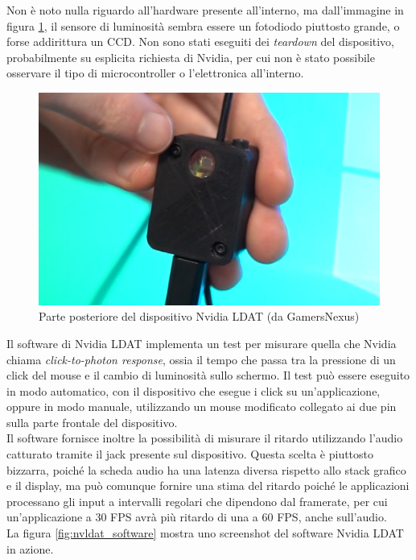 Non è noto nulla riguardo all'hardware presente all'interno, ma dall'immagine in figura \ref{fig:nvldat_back}, il sensore di luminosità sembra essere un fotodiodo piuttosto grande, o forse addirittura un CCD. Non sono stati eseguiti dei \textit{teardown} del dispositivo, probabilmente su esplicita richiesta di Nvidia, per cui non è stato possibile osservare il tipo di microcontroller o l'elettronica all'interno.

\begin{figure}[h!]
	\centering
	\includegraphics[width=\textwidth]{StatoDellArte_files/nvldat_back.jpg}
	\caption{Parte posteriore del dispositivo Nvidia LDAT (da GamersNexus)}
	\label{fig:nvldat_back}
\end{figure}

Il software di Nvidia LDAT implementa un test per misurare quella che Nvidia chiama \textit{click-to-photon response}, ossia il tempo che passa tra la pressione di un click del mouse e il cambio di luminosità sullo schermo. Il test può essere eseguito in modo automatico, con il dispositivo che esegue i click su un'applicazione, oppure in modo manuale, utilizzando un mouse modificato collegato ai due pin sulla parte frontale del dispositivo.\\
Il software fornisce inoltre la possibilità di misurare il ritardo utilizzando l'audio catturato tramite il jack presente sul dispositivo. Questa scelta è piuttosto bizzarra, poiché la scheda audio ha una latenza diversa rispetto allo stack grafico e il display, ma può comunque fornire una stima del ritardo poiché le applicazioni processano gli input a intervalli regolari che dipendono dal framerate, per cui un'applicazione a 30 FPS avrà più ritardo di una a 60 FPS, anche sull'audio.\\
La figura \ref{fig:nvldat_software} mostra uno screenshot del software Nvidia LDAT in azione.

